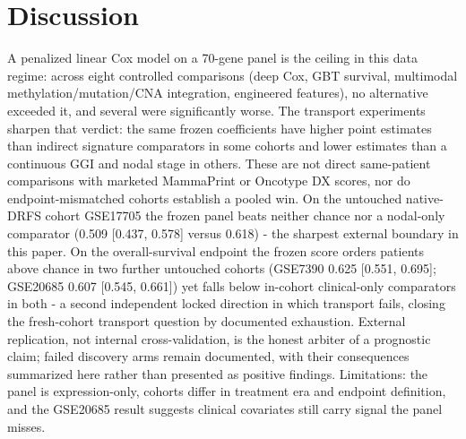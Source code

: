 \documentclass[12pt,a4paper]{article}
\begin{document}

\section{Discussion}
A penalized linear Cox model on a 70-gene panel is the ceiling in this data
regime: across eight controlled comparisons (deep Cox, GBT survival,
multimodal methylation/mutation/CNA integration, engineered features), no
alternative exceeded it, and several were significantly worse. The transport experiments sharpen that verdict: the same frozen coefficients have higher point estimates than indirect signature comparators in some cohorts and lower estimates than a continuous GGI and nodal stage in others. These are not direct same-patient comparisons with marketed MammaPrint or Oncotype DX scores, nor do endpoint-mismatched cohorts establish a pooled win. On the untouched native-DRFS cohort GSE17705 the frozen panel beats neither chance nor a nodal-only comparator (0.509 [0.437, 0.578] versus 0.618) - the sharpest external boundary in this paper. On the overall-survival endpoint the frozen score orders patients above chance in two further untouched cohorts (GSE7390 0.625 [0.551, 0.695]; GSE20685 0.607 [0.545, 0.661]) yet falls below in-cohort clinical-only comparators in both - a second independent locked direction in which transport fails, closing the fresh-cohort transport question by documented exhaustion. External replication, not internal cross-validation, is the honest
arbiter of a prognostic claim; failed discovery arms remain documented, with their consequences summarized
here rather than presented as positive findings. Limitations: the panel is expression-only,
cohorts differ in treatment era and endpoint definition, and the
GSE20685 result suggests clinical covariates still carry signal the panel
misses.
\end{document}
